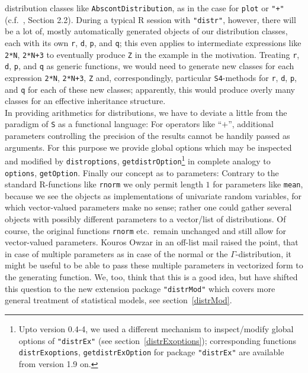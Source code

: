 \documentclass[11pt]{article}
\newcommand{\code}[1]{{\tt #1}}
\newcommand{\pkg}[1]{{\tt "#1"}}
\begin{document}
distribution classes like  \code{AbscontDistribution}, as in the case for 
\code{plot} or \code{"+"} (c.f.\ \cite{K:R:S:04}, Section 2.2). 
During a typical {\sf R} session with \pkg{distr}, however, there will be a lot 
of, mostly automatically generated objects of our distribution classes, each 
with its own \code{r}, \code{d}, \code{p}, and \code{q}; this even applies to 
intermediate expressions like \code{2*N}, \code{2*N+3} to eventually produce 
\code{Z} in the example in the motivation. Treating \code{r}, \code{d}, 
\code{p}, and \code{q} as generic functions, we would need to generate new 
classes for each expression \code{2*N}, \code{2*N+3}, \code{Z} and, 
correspondingly, particular {\tt S4}-methods for \code{r}, \code{d}, \code{p}, 
and \code{q} for each of these new classes; apparently, this would produce 
overly many classes for an effective inheritance structure. \\
In providing arithmetics for distributions, we have to deviate a little from
the paradigm of {\tt S} as a functional language: For operators like ``$+$'',
additional parameters controlling the precision of the results cannot be handily
passed as arguments. For this purpose we provide global options which may be
inspected and modified by \code{distroptions}, 
\code{getdistrOption}\footnote{Upto version 0.4-4, we used a different mechanism 
to inspect/modify global options of \pkg{distrEx} (see 
section~\ref{distrExoptions}); corresponding functions \code{distrExoptions}, 
\code{getdistrExOption} for package \pkg{distrEx} are available from version 
1.9 on.} in complete analogy to \code{options}, \code{getOption}.
%
Finally our concept as to parameters: Contrary to the standard {\sf R}-functions 
like \code{rnorm} we only permit length $1$ for parameters like \code{mean}, 
because we see the objects as implementations of univariate random variables, 
for which vector-valued parameters make no sense; rather one could gather 
several objects with possibly different parameters to a vector/list of 
distributions. Of course, the original functions \code{rnorm} etc.\ remain 
unchanged and still allow for vector-valued parameters.
Kouros Owzar  in an off-list mail raised the point, that in case of multiple 
parameters as in case of the normal or the $\Gamma$-distribution, it might be 
useful to be able to pass these multiple parameters in vectorized form to the 
generating function. We, too, think that this is a good idea, but have 
shifted this question to the new extension package \pkg{distrMod} which covers
more general treatment of statistical models, see section~\ref{distrMod}.
\end{document}
